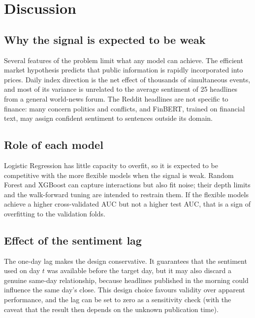 \section{Discussion}
\subsection{Why the signal is expected to be weak}
Several features of the problem limit what any model can achieve. The efficient market hypothesis predicts that public information is rapidly incorporated into prices. Daily index direction is the net effect of thousands of simultaneous events, and most of its variance is unrelated to the average sentiment of 25 headlines from a general world-news forum. The Reddit headlines are not specific to finance: many concern politics and conflicts, and FinBERT, trained on financial text, may assign confident sentiment to sentences outside its domain.

\subsection{Role of each model}
Logistic Regression has little capacity to overfit, so it is expected to be competitive with the more flexible models when the signal is weak. Random Forest and XGBoost can capture interactions but also fit noise; their depth limits and the walk-forward tuning are intended to restrain them. If the flexible models achieve a higher cross-validated AUC but not a higher test AUC, that is a sign of overfitting to the validation folds.

\subsection{Effect of the sentiment lag}
The one-day lag makes the design conservative. It guarantees that the sentiment used on day $t$ was available before the target day, but it may also discard a genuine same-day relationship, because headlines published in the morning could influence the same day's close. This design choice favours validity over apparent performance, and the lag can be set to zero as a sensitivity check (with the caveat that the result then depends on the unknown publication time).

